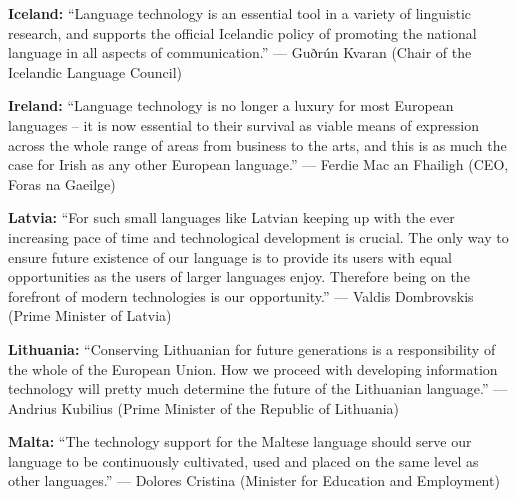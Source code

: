 \documentclass[10pt, plain]{../../metanetpaper}
\begin{document}

\medskip \textbf{Iceland:} ``Language technology is an essential tool in a variety of linguistic research, and supports the official Icelandic policy of promoting the national language in all aspects of communication.'' --- Guðrún Kvaran (Chair of the Icelandic Language Council)

\medskip \textbf{Ireland:} ``Language technology is no longer a luxury for most European languages -- it is now essential to their survival as viable means of expression across the whole range of areas from business to the arts, and this is as much the case for Irish as any other European language.'' --- Ferdie Mac an Fhailigh (CEO, Foras na Gaeilge)


\medskip \textbf{Latvia:} ``For such small languages like Latvian keeping up with the ever increasing pace of time and technological development is crucial. The only way to ensure future existence of our language is to provide its users with equal opportunities as the users of larger languages enjoy. Therefore being on the forefront of modern technologies is our opportunity.'' --- Valdis Dombrovskis (Prime Minister of Latvia)

\medskip \textbf{Lithuania:} ``Conserving Lithuanian for future generations is a responsibility of the whole of the European Union. How we proceed with developing information technology will pretty much determine the future of the Lithuanian language.'' --- Andrius Kubilius (Prime Minister of the Republic of Lithuania)


\medskip \textbf{Malta:} ``The technology support for the Maltese language should serve our language to be continuously cultivated, used and placed on the same level as other languages.'' --- Dolores Cristina (Minister for Education and Employment)

\end{document}
